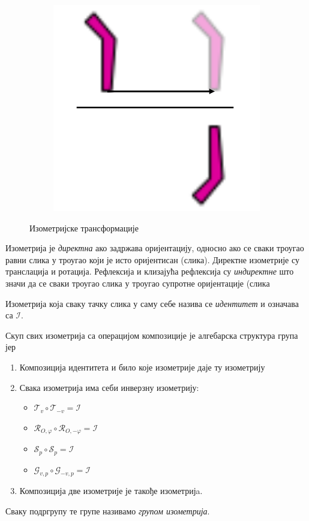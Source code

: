 \documentclass[12pt]{report}
\begin{document}
\begin{figure}[H]
\begin{subfigure}[b]{0.24\textwidth}
\end{subfigure}
\begin{subfigure}[b]{0.24\textwidth}
    \includegraphics[width=.9\textwidth]{crtez_klizajuca.png}
    \label{fig:f5}
    
\end{subfigure}
\caption{Изометријске трансформације}
\end{figure}


Изометрија је \emph{директна} ако задржава оријентацију, односно ако се сваки троугао равни слика у троугао који је исто оријентисан (слика). Директне изометрије су транслација и ротација. Рефлексија и клизајућа рефлексија су \emph{индиректне} што значи да се сваки троугао слика у троугао супротне оријентације (слика

Изометрија која сваку тачку слика у саму себе назива се \emph{идентитет} и означава са $\mathcal{I}$.

Скуп свих изометрија са операцијом композиције је алгебарска структура група јер
\begin{enumerate}
    \item Композиција идентитета и било које изометрије даје ту изометрију
    
    \item Свака изометрија има себи инверзну изометрију:
    \begin{itemize}
        \item $\mathcal{T}_v \circ \mathcal{T}_{-v} = \mathcal{I}$
        \item $\mathcal{R}_{O,\varphi} \circ \mathcal{R}_{O,-\varphi} = \mathcal{I}$
        \item $\mathcal{S}_p \circ \mathcal{S}_p = \mathcal{I}$
        \item $\mathcal{G}_{v,p} \circ \mathcal{G}_{-v,p} = \mathcal{I}$
    \end{itemize}
    \item Композиција две изометрије је такође изометријa.
\end{enumerate}
Сваку подргрупу те групе називамо \emph{групом изометрија}. 
\end{document}

